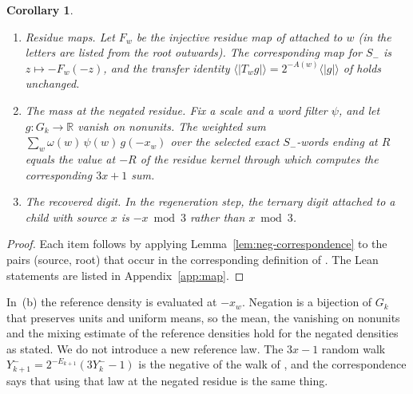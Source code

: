 \documentclass[11pt]{amsart}
\newtheorem{corollary}[theorem]{Corollary}
\theoremstyle{definition}
\theoremstyle{remark}
\newcommand{\R}{\mathbb{R}}
\newcommand{\Sm}{S_{-}}
\begin{document}
\begin{corollary}\label{cor:neg}
\begin{enumerate}[leftmargin=*,label=(\alph*)]
\item \emph{Residue maps.} Let $F_w$ be the injective residue map of \cite[\S2]{MazurM1} attached
  to $w$ (in \cite{MazurM1} the letters are listed from the root outwards). The corresponding map for $\Sm$ is
  $z\mapsto-F_w(-z)$, and the transfer identity $\langle|T_wg|\rangle=2^{-A(w)}\langle|g|\rangle$ of
  \cite[Lemma~2.1]{MazurM1} holds unchanged.
\item \emph{The mass at the negated residue.} Fix a scale and a word filter $\psi$, and let
  $g\colon G_k\to\R$ vanish on nonunits. The weighted sum $\sum_w\omega(w)\,\psi(w)\,g(-x_w)$ over
  the selected exact $\Sm$-words ending at $R$ equals the value at $-R$ of the residue kernel
  through which \cite{MazurM1} computes the corresponding $3x+1$ sum.
\item \emph{The recovered digit.} In the regeneration step, the ternary digit attached to a child
  with source $x$ is $-x\bmod3$ rather than $x\bmod3$.
\end{enumerate}
\end{corollary}

\begin{proof}
Each item follows by applying Lemma~\ref{lem:neg-correspondence} to the pairs (source, root) that
occur in the corresponding definition of \cite{MazurM1}. The Lean statements are listed in
Appendix~\ref{app:map}.
\end{proof}

In~(b) the reference density is evaluated at $-x_w$. Negation is a bijection of $G_k$ that
preserves units and uniform means, so the mean, the vanishing on nonunits and the mixing estimate
of the reference densities hold for the negated densities as stated. We do not introduce a new
reference law. The $3x-1$ random walk
$Y^-_{k+1}=2^{-E_{k+1}}(3Y^-_k-1)$ is the negative of the walk of \cite[\S2]{MazurM1}, and the
correspondence says that using that law at the negated residue is the same thing.
\end{document}
